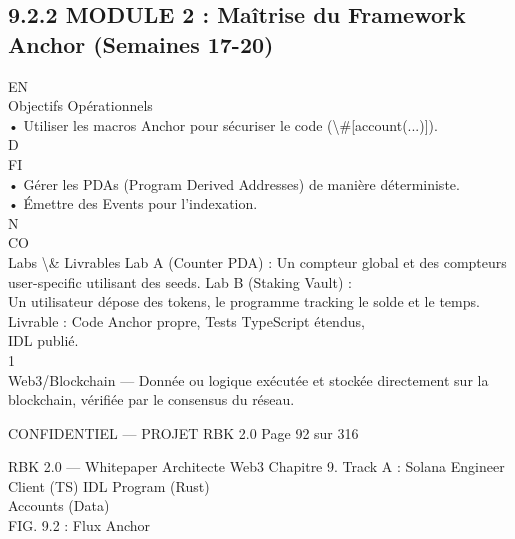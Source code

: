 \documentclass[12pt,landscape,a4paper]{article}
\newenvironment{confidential}
{\begin{tcolorbox}[
    colback=rbkred!5!white,
    colframe=rbkred!75!black,
    title=CONFIDENTIEL,
    fonttitle=\bfseries\color{white},
    coltitle=rbkred!75!black,
    breakable,
    enhanced,
    frame hidden,
    borderline west={2pt}{0pt}{rbkred!75!black}
]}
{\end{tcolorbox}}
\begin{document}
\subsection{9.2.2 MODULE 2 : Maîtrise du Framework Anchor (Semaines 17-20)}
\vspace{0.5em}
\vspace{0.5em}
\vspace{0.5em}
\vspace{0.5em}
EN\\
Objectifs Opérationnels\\
\vspace{0.5em}
• Utiliser les macros Anchor pour sécuriser le code (\textbackslash{}#[account(...)]).\\
\vspace{0.5em}
\vspace{0.5em}
\vspace{0.5em}
\vspace{0.5em}
D\\
FI\\
• Gérer les PDAs (Program Derived Addresses) de manière déterministe.\\
\vspace{0.5em}
• Émettre des Events pour l’indexation.\\
N\\
CO\\
Labs \textbackslash{}& Livrables Lab A (Counter PDA) : Un compteur global et des compteurs user-specific utilisant des seeds. Lab B (Staking Vault) :\\
Un utilisateur dépose des tokens, le programme tracking le solde et le temps. Livrable : Code Anchor propre, Tests TypeScript étendus,\\
IDL publié.\\
1\\
Web3/Blockchain — Donnée ou logique exécutée et stockée directement sur la blockchain, vérifiée par le consensus du réseau.\\
\vspace{0.5em}
\vspace{0.5em}
\vspace{0.5em}
\vspace{0.5em}
\begin{confidential}CONFIDENTIEL — PROJET RBK 2.0                                            Page 92 sur 316\end{confidential}
RBK 2.0 — Whitepaper Architecte Web3                                                                                 Chapitre 9. Track A : Solana Engineer\\
\vspace{0.5em}
\vspace{0.5em}
Client (TS)          IDL        Program (Rust)\\
\vspace{0.5em}
\vspace{0.5em}
\vspace{0.5em}
Accounts (Data)\\
\vspace{0.5em}
FIG. 9.2 : Flux Anchor\\
\vspace{0.5em}
\vspace{0.5em}
\end{document}
